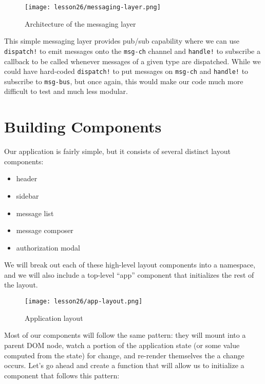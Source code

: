 \documentclass[10pt,twoside,openright]{memoir}
\begin{document}
\begin{figure}[H]
\caption{Architecture of the messaging layer}
\centering
\texttt{[image: lesson26/messaging-layer.png]}
\end{figure}

This simple messaging layer provides pub/sub capability where we can use
\texttt{dispatch!} to emit messages onto the \texttt{msg-ch} channel and
\texttt{handle!} to subscribe a callback to be called whenever messages
of a given type are dispatched. While we could have hard-coded
\texttt{dispatch!} to put messages on \texttt{msg-ch} and
\texttt{handle!} to subscribe to \texttt{msg-bus}, but once again, this
would make our code much more difficult to test and much less modular.


\section{Building Components}

Our application is fairly simple, but it consists of several distinct
layout components:

\begin{itemize}
\tightlist
\item
  header
\item
  sidebar
\item
  message list
\item
  message composer
\item
  authorization modal
\end{itemize}

We will break out each of these high-level layout components into a
namespace, and we will also include a top-level ``app'' component that
initializes the rest of the layout.

\begin{figure}[H]
\caption{Application layout}
\centering
\texttt{[image: lesson26/app-layout.png]}
\end{figure}

Most of our components will follow the same pattern: they will mount
into a parent DOM node, watch a portion of the application state (or
some value computed from the state) for change, and re-render themselves
the a change occurs. Let's go ahead and create a function that will
allow us to initialize a component that follows this pattern:
\end{document}
